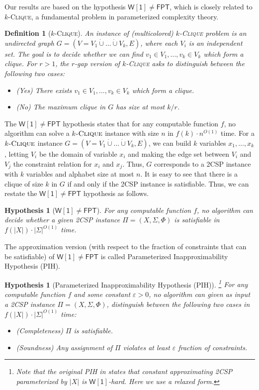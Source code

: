\documentclass[10pt,a4paper]{article}
\newtheorem{definition}[theorem]{Definition}
\newtheorem{hypothesis}[theorem]{Hypothesis}
\newcommand{\wone}{\mathsf{W[1]}}
\newcommand{\fpt}{\mathsf{FPT}}
\newcommand{\kclique}{\textsc{$k$-Clique}}
\begin{document}
Our results are based on the hypothesis $\wone \neq \fpt$, which is closely related to  \kclique{}, a fundamental problem in parameterized complexity theory. 
\begin{definition}[\kclique{}]
    An instance of (multicolored) \kclique{} problem is an undirected graph $G=(V=V_1\dot\cup\ldots\dot\cup V_k,E)$, where each $V_i$ is an independent set. The goal is to decide whether we can find $v_1 \in V_1,\ldots,v_k \in V_k$ which form a clique. For $r>1$, the $r$-gap version of \kclique{} asks to distinguish between the following two cases:
    \begin{itemize}
        \item (Yes) There exists $v_1 \in V_1,\ldots,v_k \in V_k$ which form a clique.
        \item (No) The maximum clique in $G$ has size at most $k/r$.
    \end{itemize}
\end{definition}

The $\wone\neq\fpt$ hypothesis states that for any computable function $f$, no algorithm can solve a $\kclique{}$ instance with size $n$ in $f(k)\cdot n^{O(1)}$ time. For a $\kclique{}$ instance $G=(V=V_1\dot\cup\ldots\dot\cup V_k,E)$, we can build $k$ variables $x_1,\ldots,x_k$, letting $V_i$ be the domain of variable $x_i$ and making the edge set between $V_i$ and $V_j$ the constraint relation for $x_i$ and $x_j$. Thus,  $G$ corresponds to a 2CSP instance with $k$ variables and alphabet size at most $n$. It is easy to see that there is a clique of size $k$ in $G$ if and only if the 2CSP instance is satisfiable. Thus, we can restate the $\wone\neq\fpt$ hypothesis as follows. 

\begin{hypothesis}[$\wone\neq\fpt$]
    For any computable function $f$, no algorithm can decide whether a given 2CSP instance $\Pi=(X,\Sigma,\Phi)$ is satisfiable in $f(|X|)\cdot |\Sigma|^{O(1)}$ time.
\end{hypothesis}

The approximation version (with respect to the fraction of constraints that can be satisfiable) of $\wone\neq\fpt$ is called Parameterized Inapproximability Hypothesis (PIH).
\begin{hypothesis}[Parameterized Inapproximability Hypothesis (PIH)\cite{LRSZ20}] \footnote{Note that the original PIH in \cite{LRSZ20} states that constant approximating 2CSP parameterized by $|X|$ is $\wone$-hard. Here we use a relaxed form.}
    For any computable function $f$ and some constant $\varepsilon>0$, no algorithm can given as input a 2CSP instance $\Pi=(X,\Sigma,\Phi)$, distinguish between the following two cases in $f(|X|)\cdot |\Sigma|^{O(1)}$ time:
    \begin{itemize}
        \item (Completeness) $\Pi$ is satisfiable.
        \item (Soundness) Any assignment of $\Pi$ violates at least $\varepsilon$ fraction of constraints.
    \end{itemize}
\end{hypothesis}
\end{document}
